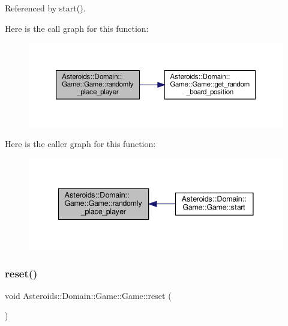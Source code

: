 Referenced by start().

Here is the call graph for this function\+:\nopagebreak
\begin{figure}[H]
\begin{center}
\leavevmode
\includegraphics[width=350pt]{classAsteroids_1_1Domain_1_1Game_1_1Game_a5de32d7dcb5350720e625be3d40cee54_cgraph}
\end{center}
\end{figure}
Here is the caller graph for this function\+:\nopagebreak
\begin{figure}[H]
\begin{center}
\leavevmode
\includegraphics[width=341pt]{classAsteroids_1_1Domain_1_1Game_1_1Game_a5de32d7dcb5350720e625be3d40cee54_icgraph}
\end{center}
\end{figure}
\mbox{\label{classAsteroids_1_1Domain_1_1Game_1_1Game_a61e639ba44b16737fdfe26887dba965f}} 
\subsubsection{\texorpdfstring{reset()}{reset()}}
{\footnotesize\ttfamily void Asteroids\+::\+Domain\+::\+Game\+::\+Game\+::reset (\begin{DoxyParamCaption}{ }\end{DoxyParamCaption})\hspace{0.3cm}{\ttfamily [virtual]}}



